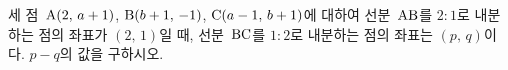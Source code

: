 세 점~$\mathrm{A}(2,\,a+1)$, $\mathrm{B}(b+1,\,-1)$, $\mathrm{C}(a-1,\,b+1)$에 대하여 선분~$\mathrm{AB}$를 $2:1$로 내분하는 점의 좌표가 $(2,\,1)$일 때, 선분~$\mathrm{BC}$를 $1:2$로 내분하는 점의 좌표는 $(p,\,q)$이다. $p-q$의 값을 구하시오.

